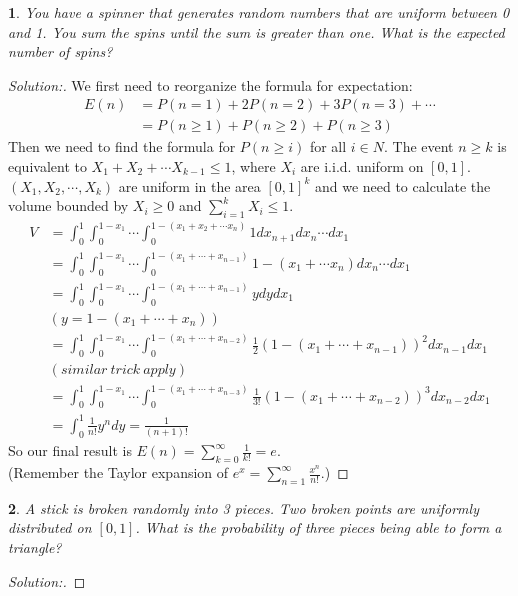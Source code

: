 \documentclass[10pt]{report}
\newtheorem{exe}{}[chapter]
\newenvironment{sol}{\begin{proof}[Solution:]}{\end{proof}}
\begin{document}
\begin{exe}
You have a spinner that generates random numbers that are uniform between 0 and 1. You sum the spins until the sum is greater than one. What is the expected number of spins?
\end{exe}
\begin{teacher}
\begin{sol}
We first need to reorganize the formula for expectation:\\
\begin{align*}
E(n) &= P(n=1) +2P(n=2) +3P(n=3)+\cdots \\
&=P(n\geq1) + P(n\geq 2) +P(n\geq3)
\end{align*}
Then we need to find the formula for $P(n\geq i)$ for all $i \in N$. The event $n\geq k$ is equivalent to $X_1+X_2+\cdots X_{k-1}\leq 1$, where $X_i$ are i.i.d. uniform on $[0,1]$. $(X_1, X_2, \cdots, X_k)$ are uniform in the area $[0,1]^k$ and we need to calculate the volume bounded by $X_i\geq 0$ and $\sum\limits_{i=1}^k X_i \leq 1$.
\begin{align*}
    V &=\int_0^1\int_0^{1-x_1}\cdots \int_0^{1-(x_1+x_2+\cdots x_n)} 1dx_{n+1}dx_n \cdots dx_1\\
    &=\int_0^1\int_0^{1-x_1}\cdots \int_0^{1-(x_1+\cdots +x_{n-1})}1-(x_1+\cdots x_n)dx_n\cdots dx_1\\
    &= \int_0^1\int_0^{1-x_1}\cdots \int_0^{1-(x_1+\cdots+x_{n-1})}ydydx_1\\
    & (y=1-(x_1+ \cdots +x_n)) \\
    &=\int_0^1\int_0^{1-x_1}\cdots \int_0^{1-(x_1+\cdots+x_{n-2})}\frac{1}{2}(1-(x_1+\cdots+x_{n-1}))^2dx_{n-1} dx_1\\
    &(similar\ trick\ apply)\\
    &=\int_0^1\int_0^{1-x_1}\cdots \int_0^{1-(x_1+\cdots+x_{n-3})}\frac{1}{3!}(1-(x_1+\cdots+x_{n-2}))^3dx_{n-2} dx_1\\
    &=\int_0^1 \frac{1}{n!}y^ndy = \frac{1}{(n+1)!}
\end{align*}
So our final result is $E(n)=\sum\limits_{k=0}^{\infty} \frac{1}{k!}=e$. \\
(Remember the Taylor expansion of $e^x = \sum\limits_{n=1}^{\infty} \frac{x^n}{n!}$.)
\end{sol}
\end{teacher}

\begin{exe}
A stick is broken randomly into 3 pieces. Two broken points are uniformly distributed on $[0,1]$. What is the probability of three pieces being able to form a triangle?
\end{exe}
\begin{teacher}
\begin{sol}
\end{sol}
\end{teacher}
\end{document}
